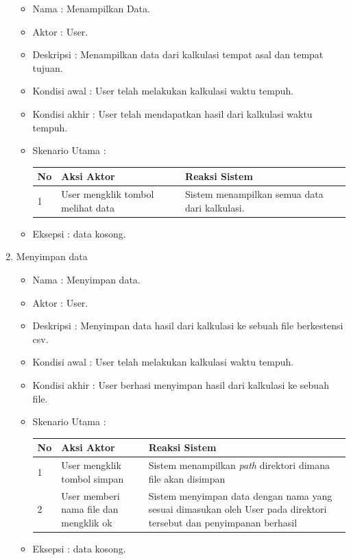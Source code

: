 \begin{enumerate}
	\begin{itemize}
		\item Nama : Menampilkan Data.
		\item Aktor : User.
		\item Deskripsi : Menampilkan data dari kalkulasi tempat asal dan tempat tujuan. 
		\item Kondisi awal : User telah melakukan kalkulasi waktu tempuh. 
		\item Kondisi akhir : User telah mendapatkan hasil dari kalkulasi waktu tempuh. 
		\item Skenario Utama : \\
		\begin{table}[H]
\centering
\begin{tabular}{|p{1cm}|p{4cm}|p{4cm}|}
\hline
No & Aksi Aktor                     & Reaksi Sistem                                                                               \\ \hline
1  & User mengklik tombol melihat data & Sistem menampilkan semua data dari kalkulasi. \\ \hline
\end{tabular}
\end{table}
		\item Eksepsi : data kosong.
	\end{itemize}
	\item Menyimpan data
	\begin{itemize}
		\item Nama : Menyimpan data.
		\item Aktor : User.
		\item Deskripsi : Menyimpan data hasil dari kalkulasi ke sebuah file berkestensi csv.
		\item Kondisi awal : User telah melakukan kalkulasi waktu tempuh. 
		\item Kondisi akhir : User berhasi menyimpan hasil dari kalkulasi ke sebuah file. 
		\item Skenario Utama : \\
		\begin{table}[H]
\centering
\begin{tabular}{|p{1cm}|p{4cm}|p{4cm}|}
\hline
No & Aksi Aktor                     & Reaksi Sistem                                                                               \\ \hline
1  & User mengklik tombol simpan & Sistem menampilkan \textit{path} direktori dimana file akan disimpan \\ \hline
2  & User memberi nama file dan mengklik ok & Sistem menyimpan data dengan nama yang sesuai dimasukan oleh User pada direktori tersebut dan penyimpanan berhasil \\ \hline
\end{tabular}
\end{table}
		\item Eksepsi : data kosong.
	\end{itemize}
\end{enumerate}

